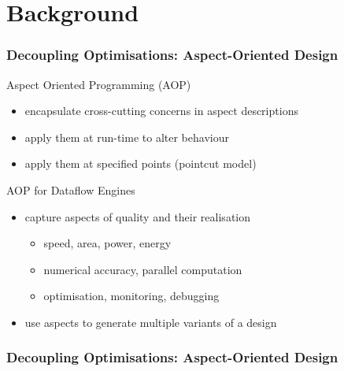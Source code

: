\section{Background}

\begin{frame}[fragile]
  \frametitle{Decoupling Optimisations: Aspect-Oriented Design}
  \begin{beamerboxesrounded}{Aspect Oriented Programming (AOP)}
    \begin{itemize}
      \item encapsulate cross-cutting concerns in aspect descriptions
      \item apply them at run-time to alter behaviour
      \item apply them at specified points (pointcut model)
    \end{itemize}
  \end{beamerboxesrounded}
  \vspace{0.75cm}
  \begin{beamerboxesrounded}{AOP for Dataflow Engines}
    \begin{itemize}
      \item capture aspects of quality and their realisation
        \begin{itemize}
          \item speed, area, power, energy
          \item numerical accuracy, parallel computation
          \item optimisation, monitoring, debugging
        \end{itemize}
      \item use aspects to generate multiple variants of a design
    \end{itemize}
  \end{beamerboxesrounded}


\end{frame}

\begin{frame}[fragile]
  \frametitle{Decoupling Optimisations: Aspect-Oriented Design}
  \begin{figure}[!ht]
  \centering
  \def\svgwidth{\textwidth}
  
\end{figure}
\end{frame}
